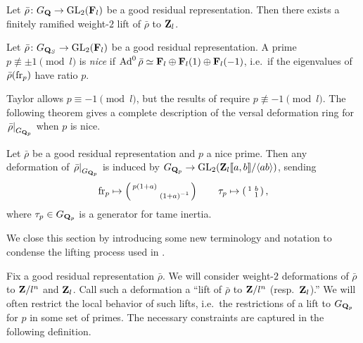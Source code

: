 \begin{theorem}\label{thm:always-can-lift}
Let $\bar\rho\colon G_{\mathbf{Q}} \to \operatorname{GL}_2(\mathbf{F}_l)$ be a good residual 
representation. Then there exists a finitely ramified weight-$2$ lift of 
$\bar\rho$ to $\mathbf{Z}_l$. 
\end{theorem}

\begin{definition}
Let $\bar\rho\colon G_{\mathbf{Q}_S} \to \operatorname{GL}_2(\mathbf{F}_l)$ be a good residual 
representation. A prime $p\not\equiv \pm 1\pmod l$ is \emph{nice} if 
$\operatorname{Ad}^0\bar\rho\simeq \mathbf{F}_l \oplus \mathbf{F}_l(1)\oplus \mathbf{F}_l(-1)$, i.e.~if the 
eigenvalues of $\bar\rho(\mathrm{fr}_p)$ have ratio $p$. 
\end{definition}

Taylor allows $p\equiv -1\pmod l$, but the results of \cite{pande-2011} 
require $p\not\equiv -1\pmod l$. The following theorem gives a complete 
description of the versal deformation ring for 
$\left.\bar\rho\right|_{G_{\mathbf{Q}_p}}$ when $p$ is nice.

\begin{theorem}
Let $\bar\rho$ be a good residual representation and $p$ a nice prime. Then 
any deformation of $\left.\bar\rho\right|_{G_{\mathbf{Q}_p}}$ is induced by 
$G_{\mathbf{Q}_p} \to \operatorname{GL}_2(\mathbf{Z}_l\llbracket a,b\rrbracket / \langle a b\rangle)$, sending 
\[
	\mathrm{fr}_p \mapsto \left(\begin{smallmatrix} p(1+a) &  \\  & (1+a)^{-1} \end{smallmatrix}\right) \qquad \tau_p \mapsto \left(\begin{smallmatrix} 1 & b \\  & 1 \end{smallmatrix}\right) ,
\]
where $\tau_p\in G_{\mathbf{Q}_p}$ is a generator for tame inertia. 
\end{theorem}

We close this section by introducing some new terminology and notation to 
condense the lifting process used in \cite{khare-larsen-ramakrishna-2005}. 

Fix a good residual representation $\bar\rho$. We will consider weight-$2$ 
deformations of $\bar\rho$ to $\mathbf{Z}/l^n$ and $\mathbf{Z}_l$. Call such a deformation a 
``lift of $\bar\rho$ to $\mathbf{Z}/l^n$ (resp.~$\mathbf{Z}_l$).'' We will often restrict the 
local behavior of such lifts, i.e.~the restrictions of a lift to $G_{\mathbf{Q}_p}$ 
for $p$ in some set of primes. The necessary constraints are captured in the 
following definition. 

